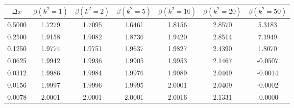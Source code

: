 \begin{tabular}{|c|c|c|c|c|c|c|}
\hline
\textbf{$\Delta x$}&\textbf{$\beta(k^2=1)$}&\textbf{$\beta(k^2=2)$}&\textbf{$\beta(k^2=5)$}&\textbf{$\beta(k^2=10)$}&\textbf{$\beta(k^2=20)$}&\textbf{$\beta(k^2=50)$}\\\hline
0.5000&1.7279&1.7095&1.6461&1.8156&2.8570&5.3183\\\hline
0.2500&1.9158&1.9082&1.8736&1.9420&2.8514&7.1949\\\hline
0.1250&1.9774&1.9751&1.9637&1.9827&2.4390&1.8070\\\hline
0.0625&1.9942&1.9936&1.9905&1.9953&2.1467&-0.0507\\\hline
0.0312&1.9986&1.9984&1.9976&1.9989&2.0469&-0.0014\\\hline
0.0156&1.9997&1.9996&1.9995&2.0001&2.0409&-0.0002\\\hline
0.0078&2.0001&2.0001&2.0001&2.0016&2.1331&-0.0000\\\hline
\end{tabular}
